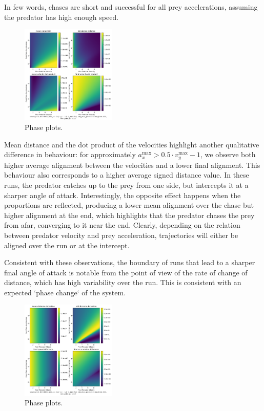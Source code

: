 \documentclass[11pt, twocolumn]{article}
\begin{document}
          In few words, chases are short and successful for all prey accelerations, assuming the predator has high enough speed.

          \begin{figure}[H]
            \centering
            \includegraphics[width=0.4\textwidth]{figures/phase_avg_dist_dot.png}
            \caption{Phase plots.}
            \label{fig:phaseplot2}
          \end{figure}

          Mean distance and the dot product of the velocities highlight another qualitative difference in behaviour: for approximately $a^{\text{max}}_x > 0.5\cdot v^{\text{max}}_y - 1$, we observe both higher average alignment between the velocities and a lower final alignment. This behaviour also corresponds to a higher average signed distance value. In these runs, the predator catches up to the prey from one side, but intercepts it at a sharper angle of attack. Interestingly, the opposite effect happens when the proportions are reflected, producing a lower mean alignment over the chase but higher alignment at the end, which highlights that the predator chases the prey from afar, converging to it near the end. Clearly, depending on the relation between predator velocity and prey acceleration, trajectories will either be aligned over the run or at the intercept.

          Consistent with these observations, the boundary of runs that lead to a sharper final angle of attack is notable from the point of view of the rate of change of distance, which has high variability over the run. This is consistent with an expected `phase change` of the system.

          \begin{figure}[H]
            \centering
            \includegraphics[width=0.4\textwidth]{figures/phase_derivative_dist.png}
            \caption{Phase plots.}
            \label{fig:phaseplot3}
          \end{figure}
\end{document}
